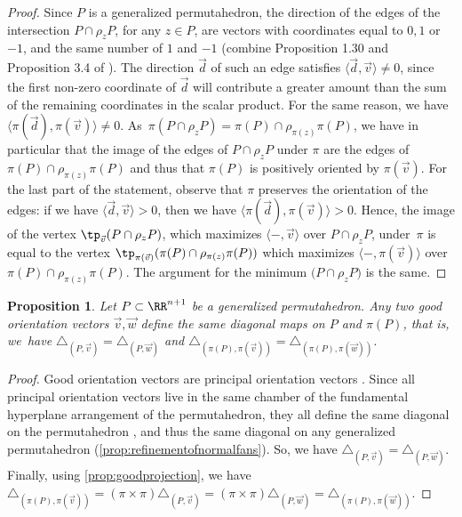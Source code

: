\documentclass[JEP,XML,SOM,NoFloatCountersInSection,Unicode,published]{cedram}
\theoremstyle{definition}
\theoremstyle{plain}
\newtheorem{proposition}[definition]{Proposition}
\begin{document}
\begin{proof}
Since $P$ is a generalized permutahedron, the direction of the edges of the intersection $P\cap\rho_z P$, for any $z \in P$, are vectors with coordinates equal to $0,1$ or $-1$, and the same number of $1$ and $-1$ (combine Proposition 1.30 and Proposition 3.4 of \cite{LA21}).
The direction $\vec d$ of such an edge satisfies $\langle \vec d, \vec v \rangle \neq 0$, since the first non-zero coordinate of $\vec d$ will contribute a greater amount than the sum of the remaining coordinates in the scalar product.
For the same reason, we have $\langle \pi(\vec d), \pi(\vec v) \rangle \neq 0$. As~$\pi(P\cap\rho_z P)=\pi(P)\cap\rho_{\pi(z)}\pi(P)$, we have in particular that the image of the edges of $P\cap\rho_z P$ under $\pi$ are the edges of $\pi(P)\cap\rho_{\pi(z)}\pi(P)$ and thus that $\pi(P)$ is positively oriented by $\pi(\vec v)$.
For the last part of the statement, observe that $\pi$ preserves the orientation of the edges: if we have $\langle \vec d, \vec v \rangle >0$, then we have $\langle \pi(\vec d), \pi(\vec v) \rangle > 0$.
Hence, the image of the vertex $\tp_{\vec v}(P\cap\rho_z P)$, which maximizes $\langle -,\vec v \rangle$ over $P\cap\rho_z P$, under~$\pi$ is equal to the vertex $\tp_{\pi(\vec v)}(\pi(P)\cap\rho_{\pi(z)} \pi(P))$ which maximizes $\langle -,\pi(\vec v) \rangle$ over $\pi(P)\cap\rho_{\pi(z)} \pi(P)$. The argument for the minimum $\bm(P\cap\rho_z P)$ is the same.
\end{proof}

\begin{proposition}
Let $P\subset\RR^{n+1}$ be a generalized permutahedron.
Any two good orientation vectors $\vec v, \vec w$ define the same diagonal maps on $P$ and $\pi(P)$, that is, we~have $\triangle_{(P,\vec v)}=\triangle_{(P,\vec w)}$ and $\triangle_{(\pi(P),\pi(\vec v))}=\triangle_{(\pi(P),\pi(\vec w))}$.
\end{proposition}
\begin{proof}
Good orientation vectors are principal orientation vectors \cite[Def.\,3.15]{LA21}. Since all principal orientation vectors live in the same chamber of the fundamental hyperplane arrangement of the permutahedron, they all define the same diagonal on the permutahedron \cite[Prop.\,1.23]{LA21}, and thus the same diagonal on any generalized permutahedron (\cref{prop:refinementofnormalfans}). So, we have $\triangle_{(P,\vec v)}=\triangle_{(P,\vec w)}$. Finally, using \cref{prop:goodprojection}, we have $\triangle_{(\pi(P),\pi(\vec v))}=(\pi \times \pi)\triangle_{(P,\vec v)}=(\pi \times \pi)\triangle_{(P,\vec w)}=\triangle_{(\pi(P),\pi(\vec w))}$.
\end{proof}
\end{document}
